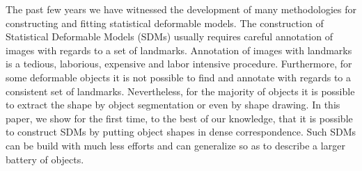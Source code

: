 
The past few years we have witnessed the development of many methodologies for constructing and fitting statistical deformable models. The construction of Statistical Deformable Models (SDMs) usually requires careful annotation of images with regards to a set of landmarks. Annotation of images with landmarks is a tedious, laborious, expensive and labor intensive procedure. Furthermore, for some deformable objects it is not possible to find and annotate with regards to a consistent set of landmarks. Nevertheless, for the majority of objects it is possible to extract the shape by object segmentation or even by shape drawing. In this paper, we show for the first time, to the best of our knowledge, that it is possible to construct SDMs by putting object shapes in dense correspondence. Such SDMs can be build with much less efforts and can generalize so as to describe a larger battery of objects.